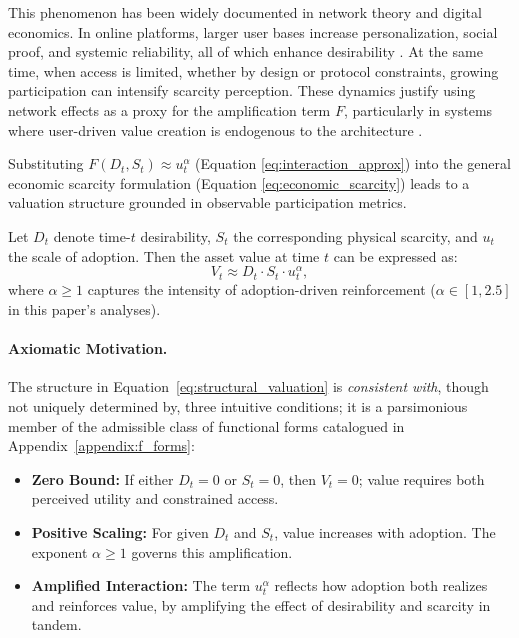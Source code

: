 \documentclass[12pt]{article}
\begin{document}
This phenomenon has been widely documented in network theory and digital economics. In online platforms, larger user bases increase personalization, social proof, and systemic reliability, all of which enhance desirability \citep{zhang2010value, brousseau2007internet}. At the same time, when access is limited, whether by design or protocol constraints, growing participation can intensify scarcity perception. These dynamics justify using network effects as a proxy for the amplification term \( F \), particularly in systems where user-driven value creation is endogenous to the architecture \citep{cong2019blockchain, easley2010networks}.

Substituting \( F(D_t, S_t) \approx u_t^\alpha \) (Equation \ref{eq:interaction_approx}) into the general economic scarcity formulation (Equation \ref{eq:economic_scarcity}) leads to a valuation structure grounded in observable participation metrics.

\begin{tcolorbox}[title=\textbf{Proposition 3 (Valuing Scarcity under Network Effects)}]
Let \( D_t \) denote time-\( t \) desirability, \( S_t \) the corresponding physical scarcity, and \( u_t \) the scale of adoption. Then the asset value at time \( t \) can be expressed as:
\begin{equation}
V_t \approx D_t \cdot S_t \cdot u_t^{\alpha},
\label{eq:structural_valuation}
\end{equation}
where \( \alpha \geq 1 \) captures the intensity of adoption-driven reinforcement (\( \alpha \in [1, 2.5] \) in this paper's analyses).
\end{tcolorbox}

\paragraph{Axiomatic Motivation.}
The structure in Equation~\eqref{eq:structural_valuation} is \emph{consistent with}, though not uniquely determined by, three intuitive conditions; it is a parsimonious member of the admissible class of functional forms catalogued in Appendix~\ref{appendix:f_forms}:
\begin{itemize}
  \item \textbf{Zero Bound:} If either \( D_t = 0 \) or \( S_t = 0 \), then \( V_t = 0 \); value requires both perceived utility and constrained access.
  \item \textbf{Positive Scaling:} For given \( D_t \) and \( S_t \), value increases with adoption. The exponent \( \alpha \geq 1 \) governs this amplification.
  \item \textbf{Amplified Interaction:} The term \( u_t^\alpha \) reflects how adoption both realizes and reinforces value, by amplifying the effect of desirability and scarcity in tandem.
\end{itemize}
\end{document}
